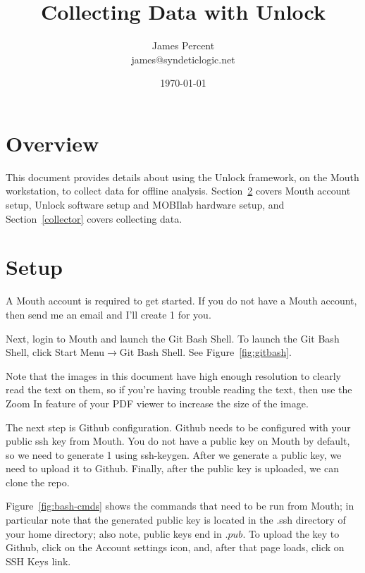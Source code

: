 \documentclass[11pt]{article}
\begin{document}
\title{\textbf{Collecting Data with Unlock}}
\author{James Percent \\
  james@syndeticlogic.net}
\date{\today}
\parskip 11pt
\parindent 0pt


\maketitle


\section{Overview}

This document provides details about using the Unlock framework, on the Mouth workstation, to collect data for offline analysis.  Section~\ref{unlock} covers Mouth account setup, Unlock software setup and MOBIlab hardware setup, and Section~\ref{collector} covers collecting data.

\section{Setup}\label{unlock}

A Mouth account is required to get started.  If you do not have a Mouth account, then send me an email and I'll create 1 for you.  

Next, login to Mouth and launch the Git Bash Shell.  To launch the Git Bash Shell, click Start Menu$\rightarrow$Git Bash Shell.  See Figure~\ref{fig:gitbash}.  

Note that the images in this document have high enough resolution to clearly read the text on them, so if you're having trouble reading the text, then use the Zoom In feature of your PDF viewer to increase the size of the image.

The next step is Github configuration.  Github needs to be configured with your public ssh key from Mouth.  You do not have a public key on Mouth by default, so we need to generate 1 using ssh-keygen.  After we generate a public key, we need to upload it to Github.  Finally, after the public key is uploaded, we can clone the repo.

Figure~\ref{fig:bash-cmds} shows the commands that need to be run from Mouth; in particular note that the generated public key is located in the .ssh directory of your home directory; also note, public keys end in $.pub$.  To upload the key to Github, click on the Account settings icon, and, after that page loads, click on SSH Keys link.
\end{document}
